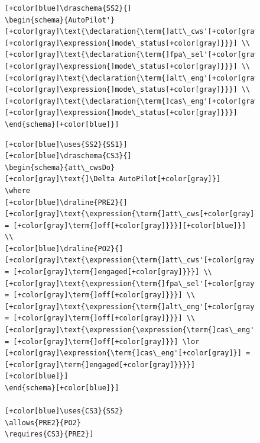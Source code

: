 \begin{figure}[H]
\begin{minipage}{0.45\textwidth}
\begin{tiny}
\begin{BVerbatim}[commandchars=+\[\]]
[+color[blue]\draschema{SS2}{]
\begin{schema}{AutoPilot'}
[+color[gray]\text{\declaration{\term{]att\_cws'[+color[gray]}]: [+color[gray]\expression{]mode\_status[+color[gray]}}}] \\
[+color[gray]\text{\declaration{\term{]fpa\_sel'[+color[gray]}]: [+color[gray]\expression{]mode\_status[+color[gray]}}}] \\
[+color[gray]\text{\declaration{\term{]alt\_eng'[+color[gray]}]: [+color[gray]\expression{]mode\_status[+color[gray]}}}] \\
[+color[gray]\text{\declaration{\term{]cas\_eng'[+color[gray]}]: [+color[gray]\expression{]mode\_status[+color[gray]}}}] 
\end{schema}[+color[blue]}]
\end{BVerbatim}
\end{tiny}
 \end{minipage}\hfill
\begin{minipage}{0.45\textwidth}
\centering
\begin{tiny}
\begin{BVerbatim}[commandchars=+\[\]]
[+color[blue]\uses{SS2}{SS1}]
[+color[blue]\draschema{CS3}{]
\begin{schema}{att\_cwsDo}
[+color[gray]\text{]\Delta AutoPilot[+color[gray]}]
\where
[+color[blue]\draline{PRE2}{]
[+color[gray]\text{\expression{\term{]att\_cws[+color[gray]}] = [+color[gray]\term{]off[+color[gray]}}}][+color[blue]}] \\
[+color[blue]\draline{PO2}{]
[+color[gray]\text{\expression{\term{]att\_cws'[+color[gray]}] = [+color[gray]\term{]engaged[+color[gray]}}}] \\
[+color[gray]\text{\expression{\term{]fpa\_sel'[+color[gray]}] = [+color[gray]\term{]off[+color[gray]}}}] \\
[+color[gray]\text{\expression{\term{]alt\_eng'[+color[gray]}] = [+color[gray]\term{]off[+color[gray]}}}] \\
[+color[gray]\text{\expression{\expression{\term{]cas\_eng'[+color[gray]}] = [+color[gray]\term{]off[+color[gray]}}] \lor
[+color[gray]\expression{\term{]cas\_eng'[+color[gray]}] = [+color[gray]\term{]engaged[+color[gray]}}}}][+color[blue]}]
\end{schema}[+color[blue]}]
     
[+color[blue]\uses{CS3}{SS2}
\allows{PRE2}{PO2}
\requires{CS3}{PRE2}]
     

\end{BVerbatim}
\end{tiny}
\end{minipage}
\end{figure}

